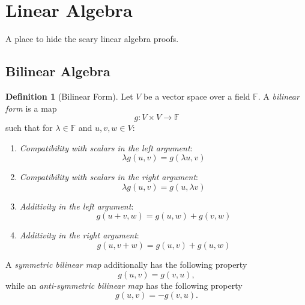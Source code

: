 \documentclass{amsart}
\theoremstyle{definition}
\newtheorem{definition}[theorem]{Definition}
\theoremstyle{remark}
\begin{document}
\section{Linear Algebra}
A place to hide the scary linear algebra proofs.

\subsection{Bilinear Algebra}
\begin{definition}[Bilinear Form]
  Let $V$ be a vector space over a field $\mathbb{F}$. A \emph{bilinear form} is a map
  \begin{equation*}
    g:V\times V\to \mathbb{F}
  \end{equation*}
  such that for $\lambda \in \mathbb{F}$ and $u, v, w \in V$:
  \begin{enumerate}
    \item \emph{Compatibility with scalars in the left argument}:
    \begin{equation*}
      \lambda g(u, v) = g(\lambda u, v)
    \end{equation*}
    \item \emph{Compatibility with scalars in the right argument}:
    \begin{equation*}
      \lambda g(u, v) = g(u, \lambda v)
    \end{equation*}
    \item \emph{Additivity in the left argument}:
    \begin{equation*}
      g(u + v, w) = g(u, w) + g(v, w)
    \end{equation*}
    \item \emph{Additivity in the right argument}:
    \begin{equation*}
      g(u, v + w) = g(u, v) + g(u, w)
    \end{equation*}
  \end{enumerate}
  A \emph{symmetric bilinear map} additionally has the following property
  \begin{equation*}
    g(u, v) = g(v, u),
  \end{equation*}
  while an \emph{anti-symmetric bilinear map} has the following property
  \begin{equation*}
    g(u, v) = -g(v, u).
  \end{equation*}
\end{definition}
\end{document}
